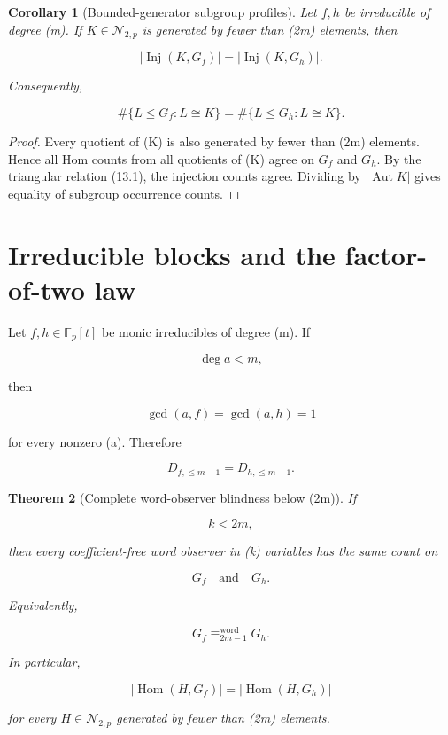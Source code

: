 \documentclass[11pt]{article}
\newtheorem{theorem}{Theorem}[section]
\newtheorem{corollary}[theorem]{Corollary}
\begin{document}
\begin{corollary}[Bounded-generator subgroup profiles]
Let $f,h$ be irreducible of degree (m). If $K\in\mathcal N_{2,p}$ is generated by fewer than (2m) elements, then

\[
|\operatorname{Inj}(K,G_f)|
=|\operatorname{Inj}(K,G_h)|.
\]

Consequently,

\[
\#\{L\le G_f:L\cong K\}
=\#\{L\le G_h:L\cong K\}.
\]

\end{corollary}

\begin{proof}
Every quotient of (K) is also generated by fewer than (2m) elements. Hence all Hom counts from all quotients of (K) agree on $G_f$ and $G_h$. By the triangular relation (13.1), the injection counts agree. Dividing by $|\operatorname{Aut}K|$ gives equality of subgroup occurrence counts.

\end{proof}

\section{Irreducible blocks and the factor-of-two law}

Let $f,h\in\mathbb F_p[t]$ be monic irreducibles of degree (m). If

\[
\deg a<m,
\]

then

\[
\gcd(a,f)=\gcd(a,h)=1
\]

for every nonzero (a). Therefore

\[
D_{{f},\le m-1}
=D_{{h},\le m-1}.
\]

\begin{theorem}[Complete word-observer blindness below (2m)]
If

\[
k<2m,
\]

then every coefficient-free word observer in (k) variables has the same count on

\[
G_f
\quad\text{and}\quad
G_h.
\]

Equivalently,

\[
G_f\equiv_{2m-1}^{\mathrm{word}}G_h.
\]

In particular,

\[
|\operatorname{Hom}(H,G_f)|
=|\operatorname{Hom}(H,G_h)|
\]

for every $H\in\mathcal N_{2,p}$ generated by fewer than (2m) elements.

\end{theorem}
\end{document}
